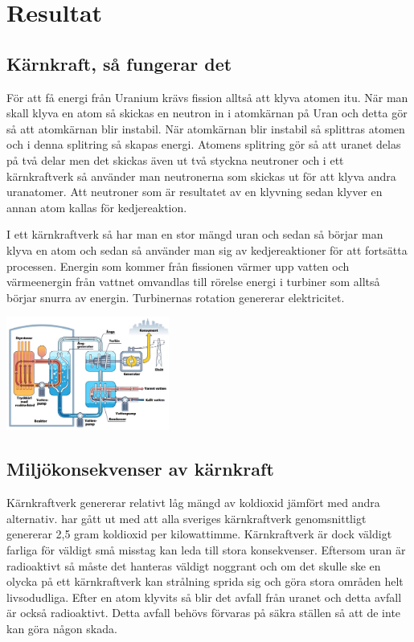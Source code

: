 \documentclass[11p]{article}
\begin{document}
    \section{Resultat}

    \subsection{Kärnkraft, så fungerar det}
    För att få energi från Uranium krävs fission alltså att klyva atomen itu.
    När man skall klyva en atom så skickas en neutron in i atomkärnan på Uran och detta gör så att atomkärnan blir instabil.
    När atomkärnan blir instabil så splittras atomen och i denna splitring så skapas energi.
    Atomens splitring gör så att uranet delas på två delar men det skickas även ut två styckna neutroner och i ett kärnkraftverk så använder man neutronerna som skickas ut för att klyva andra uranatomer.
    Att neutroner som är resultatet av en klyvning sedan klyver en annan atom kallas för kedjereaktion.

    I ett kärnkraftverk så har man en stor mängd uran och sedan så börjar man klyva en atom och sedan så använder man sig av kedjereaktioner för att fortsätta processen.
    Energin som kommer från fissionen värmer upp vatten och värmeenergin från vattnet omvandlas till rörelse energi i turbiner som alltså börjar snurra av energin.
    Turbinernas rotation genererar elektricitet.
    \parencite{Wikipedia}
    \parencite{TekniskaMuseet}


\includegraphics[width=0.4\textwidth]{../images/karnkraftverk-2.jpg}


    \subsection{Miljökonsekvenser av kärnkraft}
    Kärnkraftverk genererar relativt låg mängd av koldioxid jämfört med andra alternativ.
    \textcite{Vattenfall} har gått ut med att alla sveriges kärnkraftverk genomsnittligt genererar 2,5 gram koldioxid per kilowattimme.
    Kärnkraftverk är dock väldigt farliga för väldigt små misstag kan leda till stora konsekvenser.
    Eftersom uran är radioaktivt så måste det hanteras väldigt noggrant och om det skulle ske en olycka på ett kärnkraftverk kan strålning sprida sig och göra stora områden helt livsodudliga.
    Efter en atom klyvits så blir det avfall från uranet och detta avfall är också radioaktivt.
    Detta avfall behövs förvaras på säkra ställen så att de inte kan göra någon skada.
\parencite{Vattenfall2}
\end{document}
